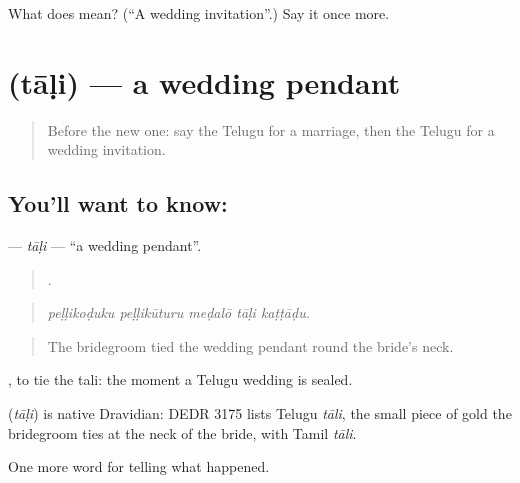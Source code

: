 \begin{tcolorbox}[breakable,colback=teal!4,colframe=teal!35!black,title={Before you move on}]
What does  mean? (\textquotedblleft{}A wedding invitation\textquotedblright{}.) Say it once more.
\end{tcolorbox}
\section[\texorpdfstring{\te{తాళి} (tāḷi)}{తాళి (tāḷi)}]{ (tāḷi) — a wedding pendant}

\label{lesson:TE-C346-tali}



\begin{quote}
Before the new one: say the Telugu for a marriage, then the Telugu for a wedding invitation.
\end{quote}

\subsection*{You'll want to know: }
\textbf{} — \emph{tāḷi} — \textquotedblleft{}a wedding pendant\textquotedblright{}.

\begin{quote}
    .
\end{quote}

\begin{quote}
\emph{peḷḷikoḍuku peḷḷikūturu meḍalō tāḷi kaṭṭāḍu.}
\end{quote}

\begin{quote}
The bridegroom tied the wedding pendant round the bride's neck.
\end{quote}

 , to tie the tali: the moment a Telugu wedding is sealed.

\begin{cousinweb}
\textbf{} (\emph{tāḷi}) is native Dravidian: DEDR 3175 lists Telugu \emph{tāli}, the small piece of gold the bridegroom ties at the neck of the bride, with Tamil \emph{tāli}.
\end{cousinweb}

\begin{grammarlens}[title={What you've built}]
One more word for telling what happened.
\end{grammarlens}

